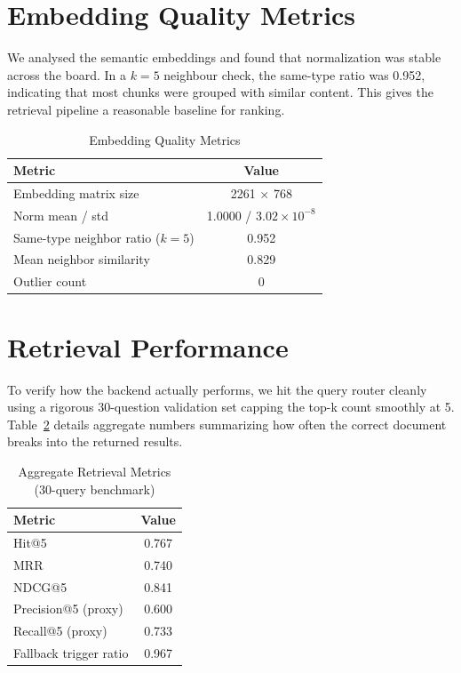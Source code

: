 \documentclass[12pt,a4paper]{report}
\begin{document}
\section{Embedding Quality Metrics}

We analysed the semantic embeddings and found that normalization was stable across the board. In a $k=5$ neighbour check, the same-type ratio was 0.952, indicating that most chunks were grouped with similar content. This gives the retrieval pipeline a reasonable baseline for ranking.

\begin{table}[htbp]
  \centering
    \vspace*{5pt}
  \begin{tabular}{|l|c|}
    \hline
    \textbf{Metric} & \textbf{Value} \\ \hline
    Embedding matrix size & 2261 $\times$ 768 \\ \hline
    Norm mean / std & 1.0000 / $3.02 \times 10^{-8}$ \\ \hline
    Same-type neighbor ratio ($k=5$) & 0.952 \\ \hline
    Mean neighbor similarity & 0.829 \\ \hline
    Outlier count & 0 \\ \hline
  \end{tabular}
  \caption{Embedding Quality Metrics}
  \label{tab:embedding_quality}

\end{table}

\section{Retrieval Performance}

To verify how the backend actually performs, we hit the query router cleanly using a rigorous 30-question validation set capping the top-k count smoothly at 5. Table~\ref{tab:retrieval_aggregate} details aggregate numbers summarizing how often the correct document breaks into the returned results.

\begin{table}[htbp]
  \centering
    \vspace*{5pt}
  \begin{tabular}{|l|c|}
    \hline
    \textbf{Metric} & \textbf{Value} \\ \hline
    Hit@5 & 0.767 \\ \hline
    MRR & 0.740 \\ \hline
    NDCG@5 & 0.841 \\ \hline
    Precision@5 (proxy) & 0.600 \\ \hline
    Recall@5 (proxy) & 0.733 \\ \hline
    Fallback trigger ratio & 0.967 \\ \hline
  \end{tabular}
  \caption{Aggregate Retrieval Metrics (30-query benchmark)}
  \label{tab:retrieval_aggregate}

\end{table}
\end{document}

